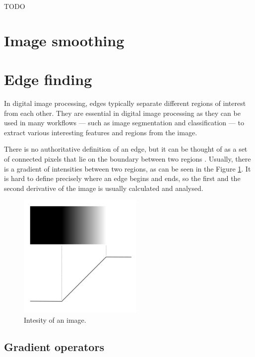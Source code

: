 \documentclass[
  digital,     %
  oneside,     %
  nosansbold,  %
  nocolorbold, %
  lof,         %
  lot,         %
]{fithesis4}
\begin{document}
TODO

\section{Image smoothing}

\section{Edge finding}

In digital image processing, edges typically separate different regions of
interest from each other. They are essential in digital image processing
as they can be used in many workflows --- such as image segmentation and
classification --- to extract various interesting features and regions
from the image.

There is no authoritative definition of an edge, but it can be thought of as a
set of connected pixels that lie on the boundary between two regions
\parencite{gonzalez2002}. Usually, there is a gradient of intensities between two
regions, as can be seen in the Figure \ref{fig:edge_intensities}. It is hard to
define precisely where an edge begins and ends, so the first and the second
derivative of the image is usually calculated and analysed.


\begin{figure}
    \begin{center}
        \includegraphics[width=6cm]{resources/inkscape/gradient.png}
    \end{center}
    \caption{Intesity of an image.}
    \label{fig:edge_intensities}
\end{figure}

\subsection{Gradient operators}
\end{document}
